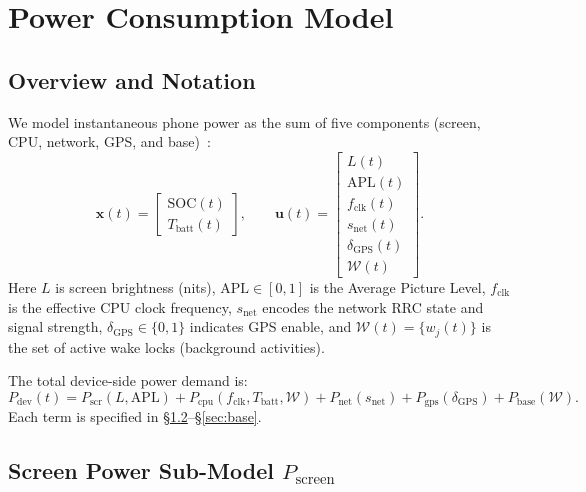 \documentclass{mcmthesis}
\begin{document}
\section{Power Consumption Model}
\label{sec:model}

\subsection{Overview and Notation}
\label{sec:model:overview}

We model instantaneous phone power as the sum of five components
(screen, CPU, network, GPS, and base)~\cite{refSingh2020,ref22,ref27,ref33,ref37,ref38}:
\begin{equation}
  \mathbf{x}(t)=
  \begin{bmatrix}
    \mathrm{SOC}(t)\\
    T_{\mathrm{batt}}(t)
  \end{bmatrix},
  \qquad
  \mathbf{u}(t)=
  \begin{bmatrix}
    L(t)\\
    \mathrm{APL}(t)\\
    f_{\mathrm{clk}}(t)\\
    s_{\mathrm{net}}(t)\\
    \delta_{\mathrm{GPS}}(t)\\
    \mathcal{W}(t)
  \end{bmatrix}.
  \label{eq:state_vectors}
\end{equation}
Here $L$ is screen brightness (nits), $\mathrm{APL}\in[0,1]$ is the Average Picture Level,
$f_{\mathrm{clk}}$ is the effective CPU clock frequency, $s_{\mathrm{net}}$ encodes the network
RRC state and signal strength, $\delta_{\mathrm{GPS}}\in\{0,1\}$ indicates GPS enable, and
$\mathcal{W}(t)=\{w_j(t)\}$ is the set of active wake locks (background activities).

The total device-side power demand is:
\begin{equation}
  P_{\mathrm{dev}}(t)=
  P_{\mathrm{scr}}\!\left(L,\mathrm{APL}\right)+
  P_{\mathrm{cpu}}\!\left(f_{\mathrm{clk}},T_{\mathrm{batt}},\mathcal{W}\right)+
  P_{\mathrm{net}}\!\left(s_{\mathrm{net}}\right)+
  P_{\mathrm{gps}}\!\left(\delta_{\mathrm{GPS}}\right)+
  P_{\mathrm{base}}\!\left(\mathcal{W}\right).
  \label{eq:p_total_components}
\end{equation}
Each term is specified in \S\ref{sec:screen}--\S\ref{sec:base}.

\subsection{Screen Power Sub-Model \texorpdfstring{$P_{\text{screen}}$}{P\_screen}}
\label{sec:screen}
\end{document}
